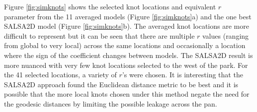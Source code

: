 \documentclass[letterpaper]{interact}
\begin{document}

Figure \ref{fig:simknots} shows the selected knot locations and equivalent $r$ parameter from the 11 averaged models (Figure \ref{fig:simknots}a) and the one best SALSA2D model (Figure \ref{fig:simknots}b). The averaged knot locations are more difficult to represent but it can be seen that there are multiple $r$ values (ranging from global to very local) across the same locations and occasionally a location where the sign of the coefficient changes between models. The SALSA2D result is more nuanced with very few knot locations selected to the west of the park. For the 41 selected locations, a variety of $r$'s were chosen. It is interesting that the SALSA2D approach found the Euclidean distance metric to be best and it is possible that the more local knots chosen under this method negate the need for the geodesic distances by limiting the possible leakage across the pan.  
\end{document}
